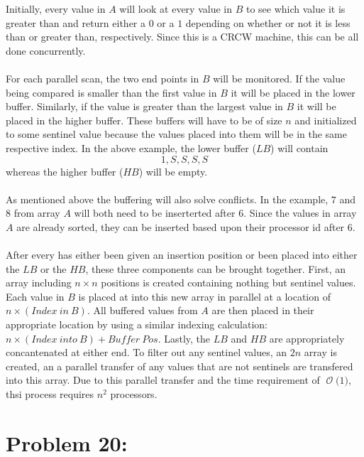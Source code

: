 \documentclass[12pt]{article}
\newcommand{\BigO}[1]{\ensuremath{\operatorname{\mathcal{O}}\bigl(#1\bigr)}}
\begin{document}
Initially, every value in $A$ will look at every value in $B$ to see
which value it is greater than and return either a $0$ or a $1$ 
depending on whether or not it is less than or greater than, respectively.
Since this is a CRCW machine, this can be all done concurrently.\\\\
For each parallel scan, the two end points in $B$ will be monitored.  If
the value being compared is smaller than the first value in $B$ it will be
placed in the lower buffer.  Similarly, if the value is greater than the
largest value in $B$ it will be placed in the higher buffer.  These buffers
will have to be of size $n$ and initialized to some sentinel value because
the values placed into them will be in the same respective index.  In the
above example, the lower buffer ($LB$) will contain \[1,S,S,S,S\] whereas
the higher buffer ($HB$) will be empty.  \\\\
As mentioned above the buffering will also solve conflicts.  In the example,
$7$ and $8$ from array $A$ will both need to be inserterted after $6$.  Since
the values in array $A$ are already sorted, they can be inserted based upon 
their processor id after $6$.\\\\
After every has either been given an insertion position or been placed into
either the $LB$ or the $HB$, these three components can be brought together.
First, an array including $n\times n$ positions is created containing
nothing but sentinel values.  Each value in $B$ is placed at into this new
array in parallel at a location of $n\times (Index\ in\ B)$.  All buffered
values from $A$ are then placed in their appropriate location by using a similar
indexing calculation: $n\times (Index\ into\ B) + Buffer\ Pos$.  Lastly,
the $LB$ and $HB$ are appropriately concantenated at either end.
To filter out any sentinel values, an $2n$ array is created, an a parallel
transfer of any values that are not sentinels are transfered into this array.
Due to this parallel transfer and the time requirement of \BigO{1}, thsi process
requires $n^2$ processors.    
\section*{Problem 20: }
\end{document}
